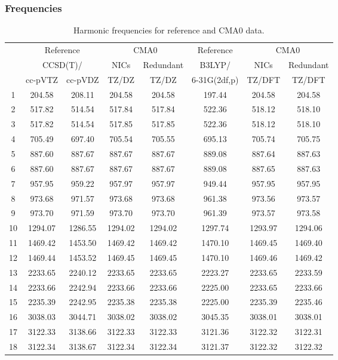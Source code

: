 \documentclass[10pt,oneside]{article}
\begin{document}
\begin{table}[h!]
\subsubsection*{Frequencies}
\centering
\caption{Harmonic frequencies for reference and CMA0 data.}
\begin{tabular}{cccccccc}
\toprule
{} & \multicolumn{2}{c}{Reference} & \multicolumn{2}{c}{CMA0} &    Reference & \multicolumn{2}{c}{CMA0} \\
{} & \multicolumn{2}{c}{CCSD(T)/} &    NICs &  Redundant &       B3LYP/ &    NICs & Redundant \\
{} &   cc-pVTZ & cc-pVDZ &   TZ/DZ &      TZ/DZ & 6-31G(2df,p) &  TZ/DFT &    TZ/DFT \\
\midrule
1  &    204.58 &  208.11 &  204.58 &     204.58 &       197.44 &  204.58 &    204.58 \\
2  &    517.82 &  514.54 &  517.84 &     517.84 &       522.36 &  518.12 &    518.10 \\
3  &    517.82 &  514.54 &  517.85 &     517.85 &       522.36 &  518.12 &    518.10 \\
4  &    705.49 &  697.40 &  705.54 &     705.55 &       695.13 &  705.74 &    705.75 \\
5  &    887.60 &  887.67 &  887.67 &     887.67 &       889.08 &  887.64 &    887.63 \\
6  &    887.60 &  887.67 &  887.67 &     887.67 &       889.08 &  887.65 &    887.63 \\
7  &    957.95 &  959.22 &  957.97 &     957.97 &       949.44 &  957.95 &    957.95 \\
8  &    973.68 &  971.57 &  973.68 &     973.68 &       961.38 &  973.56 &    973.57 \\
9  &    973.70 &  971.59 &  973.70 &     973.70 &       961.39 &  973.57 &    973.58 \\
10 &   1294.07 & 1286.55 & 1294.02 &    1294.02 &      1297.74 & 1293.97 &   1294.06 \\
11 &   1469.42 & 1453.50 & 1469.42 &    1469.42 &      1470.10 & 1469.45 &   1469.40 \\
12 &   1469.44 & 1453.52 & 1469.45 &    1469.45 &      1470.10 & 1469.46 &   1469.42 \\
13 &   2233.65 & 2240.12 & 2233.65 &    2233.65 &      2223.27 & 2233.65 &   2233.59 \\
14 &   2233.66 & 2242.94 & 2233.66 &    2233.66 &      2225.00 & 2233.65 &   2233.66 \\
15 &   2235.39 & 2242.95 & 2235.38 &    2235.38 &      2225.00 & 2235.39 &   2235.46 \\
16 &   3038.03 & 3044.71 & 3038.02 &    3038.02 &      3045.35 & 3038.01 &   3038.01 \\
17 &   3122.33 & 3138.66 & 3122.33 &    3122.33 &      3121.36 & 3122.32 &   3122.31 \\
18 &   3122.34 & 3138.67 & 3122.34 &    3122.34 &      3121.37 & 3122.32 &   3122.32 \\
\bottomrule
\end{tabular}
\end{table}
\end{document}
